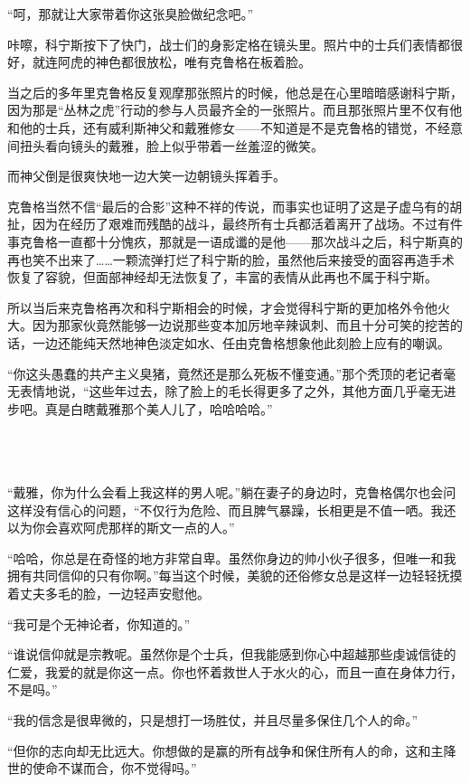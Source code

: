 “呵，那就让大家带着你这张臭脸做纪念吧。”

咔嚓，科宁斯按下了快门，战士们的身影定格在镜头里。照片中的士兵们表情都很好，就连阿虎的神色都很放松，唯有克鲁格在板着脸。

当之后的多年里克鲁格反复观摩那张照片的时候，他总是在心里暗暗感谢科宁斯，因为那是“丛林之虎”行动的参与人员最齐全的一张照片。而且那张照片里不仅有他和他的士兵，还有威利斯神父和戴雅修女——不知道是不是克鲁格的错觉，不经意间扭头看向镜头的戴雅，脸上似乎带着一丝羞涩的微笑。

而神父倒是很爽快地一边大笑一边朝镜头挥着手。

克鲁格当然不信“最后的合影”这种不祥的传说，而事实也证明了这是子虚乌有的胡扯，因为在经历了艰难而残酷的战斗，最终所有士兵都活着离开了战场。不过有件事克鲁格一直都十分愧疚，那就是一语成谶的是他——那次战斗之后，科宁斯真的再也笑不出来了……一颗流弹打烂了科宁斯的脸，虽然他后来接受的面容再造手术恢复了容貌，但面部神经却无法恢复了，丰富的表情从此再也不属于科宁斯。

所以当后来克鲁格再次和科宁斯相会的时候，才会觉得科宁斯的更加格外令他火大。因为那家伙竟然能够一边说那些变本加厉地辛辣讽刺、而且十分可笑的挖苦的话，一边还能纯天然地神色淡定如水、任由克鲁格想象他此刻脸上应有的嘲讽。

“你这头愚蠢的共产主义臭猪，竟然还是那么死板不懂变通。”那个秃顶的老记者毫无表情地说，“这些年过去，除了脸上的毛长得更多了之外，其他方面几乎毫无进步吧。真是白瞎戴雅那个美人儿了，哈哈哈哈。”

 \section*{}

“戴雅，你为什么会看上我这样的男人呢。”躺在妻子的身边时，克鲁格偶尔也会问这样没有信心的问题，“不仅行为危险、而且脾气暴躁，长相更是不值一哂。我还以为你会喜欢阿虎那样的斯文一点的人。”

“哈哈，你总是在奇怪的地方非常自卑。虽然你身边的帅小伙子很多，但唯一和我拥有共同信仰的只有你啊。”每当这个时候，美貌的还俗修女总是这样一边轻轻抚摸着丈夫多毛的脸，一边轻声安慰他。

“我可是个无神论者，你知道的。”

“谁说信仰就是宗教呢。虽然你是个士兵，但我能感到你心中超越那些虔诚信徒的仁爱，我爱的就是你这一点。你也怀着救世人于水火的心，而且一直在身体力行，不是吗。”

“我的信念是很卑微的，只是想打一场胜仗，并且尽量多保住几个人的命。”

“但你的志向却无比远大。你想做的是赢的所有战争和保住所有人的命，这和主降世的使命不谋而合，你不觉得吗。”

